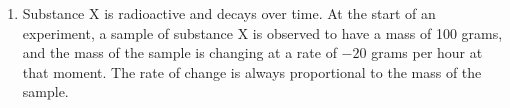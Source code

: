 \documentclass{article}
\theoremstyle{theorem}
\begin{document}
\begin{enumerate}
\begin{enumerate}
    \begin{grading}
      A common error is to draw a function that isn't defined on the entire domain $[-2, 2]$. Check your example to make sure it's really defined at every point in $[-2, 2]$. 
    \end{grading}

  \end{enumerate}

  \pspace{\newpage}

\item {} 

 Substance X is radioactive and decays over time. At the start of an experiment, a sample of substance X is observed to have a mass of 100 grams, and the mass of the sample is changing at a rate of $-20$ grams per hour at that moment. The rate of change is always proportional to the mass of the sample.


\end{enumerate}
\end{document}
